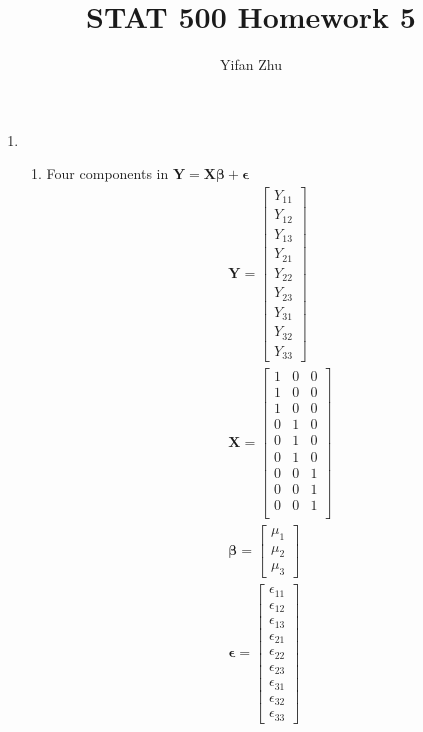 \documentclass{article}
\begin{document}
	

	
	\title{STAT 500 Homework 5}
	\author{Yifan Zhu}
	\maketitle
	
	\begin{enumerate}[leftmargin = 0 em, label = \arabic*., font = \bfseries]
	\item
	\begin{enumerate}
		\item Four components in ${\bm Y} = \bm X \bm \beta + \bm \epsilon$
		\begin{align*}
		& \bm Y = \begin{bmatrix}
			Y_{11}\\
			Y_{12}\\
			Y_{13}\\
			Y_{21}\\
			Y_{22}\\
			Y_{23}\\
			Y_{31}\\
			Y_{32}\\
			Y_{33}
		\end{bmatrix}
		\\
		& \bm X = \begin{bmatrix}
			1&0&0\\
			1&0&0\\
			1&0&0\\
			0&1&0\\
			0&1&0\\
			0&1&0\\
			0&0&1\\
			0&0&1\\
			0&0&1\\
		\end{bmatrix}
		\\
		& \bm \beta = \begin{bmatrix}
			\mu_1\\
			\mu_2\\
			\mu_3
		\end{bmatrix}
		\\
		& \bm \epsilon = \begin{bmatrix}
			\epsilon_{11}\\
			\epsilon_{12}\\
			\epsilon_{13}\\
			\epsilon_{21}\\
			\epsilon_{22}\\
			\epsilon_{23}\\
			\epsilon_{31}\\
			\epsilon_{32}\\
			\epsilon_{33}
		\end{bmatrix}
		\end{align*}
		


\end{enumerate}
\end{enumerate}
\end{document}
